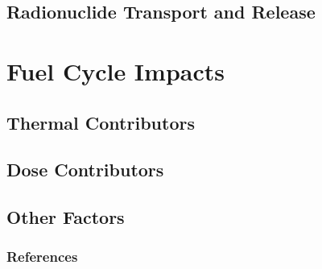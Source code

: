 \documentclass[9pt]{beamer}
\begin{document}
\subsection{Radionuclide Transport and Release}


\section{Fuel Cycle Impacts}
\subsection{Thermal Contributors}

\subsection{Dose Contributors}

\subsection{Other Factors}



\begin{frame}[allowframebreaks]
  \frametitle{References}
  
  {\footnotesize  }

\end{frame}

\end{document}

